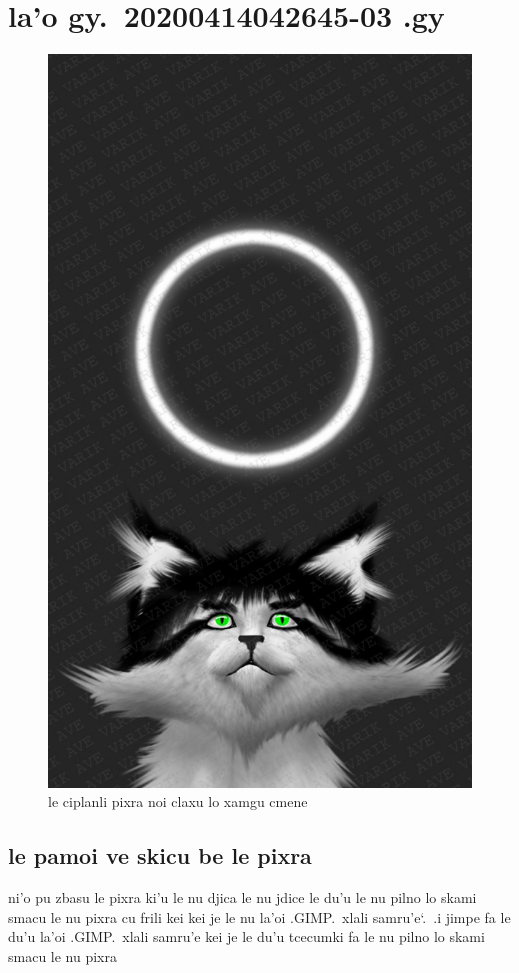 \documentclass{report}
\newcommand\sds{\spacefactor\sfcode`.\ \space}
\begin{document}
\chapter{la'o gy.\ 20200414042645-03 .gy}
\begin{figure}[ht]
	\centering
	\includegraphics[keepaspectratio, width=\textwidth, height=0.75\textheight]{20200414042645-03/20200414042645-03.jpg}
	\caption[center]{le ciplanli pixra noi claxu lo xamgu cmene}
\end{figure}
\section{le pamoi ve skicu be le pixra}
ni'o pu zbasu le pixra ki'u le nu djica le nu jdice le du'u le nu pilno lo skami smacu le nu pixra cu frili kei kei je le nu la'oi .GIMP.\ xlali samru'e\sds  .i jimpe fa le du'u la'oi .GIMP.\ xlali samru'e kei je le du'u tcecumki fa le nu pilno lo skami smacu le nu pixra
\end{document}
